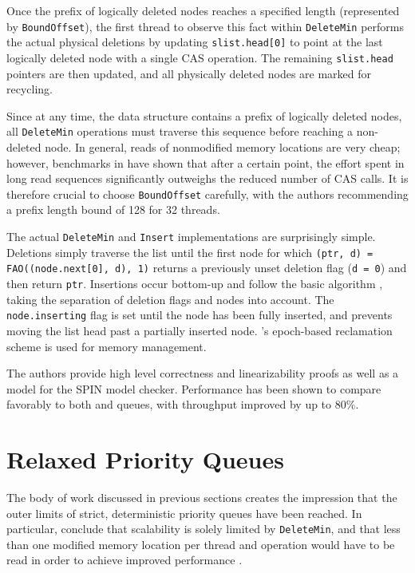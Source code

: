 Once the prefix of logically deleted nodes reaches a specified length (represented by \lstinline|BoundOffset|),
the first thread to observe this fact within \lstinline|DeleteMin| performs the actual physical
deletions by updating \lstinline|slist.head[0]| to point at the last logically deleted node with a
single \ac{CAS} operation. The remaining \lstinline|slist.head| pointers are then updated, and
all physically deleted nodes are marked for recycling.

Since at any time, the data structure contains a prefix of logically deleted nodes, all \lstinline|DeleteMin|
operations must traverse this sequence before reaching a non-deleted node. In general, reads of nonmodified
memory locations are very cheap; however, benchmarks in \cite{linden2013skiplist} have shown that
after a certain point, the effort spent in long read sequences significantly outweighs the reduced
number of \ac{CAS} calls. It is therefore crucial to choose \lstinline|BoundOffset| carefully, with the
authors recommending a prefix length bound of 128 for 32 threads.

The actual \lstinline|DeleteMin| and \lstinline|Insert| implementations are surprisingly simple.
Deletions simply traverse the list until the first node for which \lstinline|(ptr, d) = FAO((node.next[0], d), 1)|
returns a previously unset deletion flag (\lstinline|d = 0|) and then return \lstinline|ptr|.
Insertions occur bottom-up and follow the basic \citeauthor{fraser2004practical} algorithm \cite{fraser2004practical},
taking the separation of deletion flags and nodes into account. The \lstinline|node.inserting| flag
is set until the node has been fully inserted, and prevents moving the list head past a partially
inserted node. \citeauthor{fraser2004practical}'s epoch-based reclamation scheme \cite{fraser2004practical}
is used for memory management.

The authors provide high level correctness and linearizability proofs as well as a model for the
SPIN model checker. Performance has been shown to compare favorably to both
\citeauthor{sundell2003fast} and \citeauthor{shavit2000skiplist} queues, with throughput improved by
up to $80\%$.

\section{Relaxed Priority Queues} \label{sec:relaxed}

The body of work discussed in previous sections
creates the impression that the outer limits of strict, deterministic priority queues have been reached.
In particular, \citeauthor{linden2013skiplist} conclude that scalability is solely limited by \lstinline|DeleteMin|,
and that less than one modified memory location per thread and operation would have to be read
in order to achieve improved performance \cite{linden2013skiplist}.

